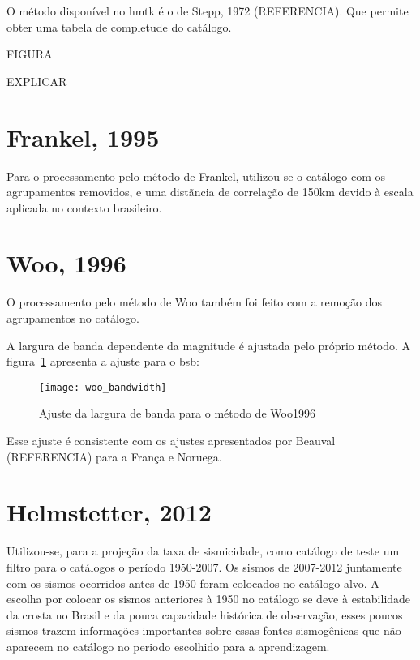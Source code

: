 O método disponível no \gls{hmtk} é o de Stepp, 1972 (REFERENCIA). Que permite
obter uma tabela de completude do catálogo.

FIGURA


EXPLICAR


\section{Frankel, 1995}
\label{sec:proc_frankel}

Para o processamento pelo método de Frankel, utilizou-se o catálogo com os agrupamentos removidos,
e uma distãncia de correlação de 150km devido à escala aplicada no contexto brasileiro.

\section{Woo, 1996}
\label{sec:proc_woo}

O processamento pelo método de Woo também foi feito com a remoção dos agrupamentos no catálogo.

A largura de banda dependente da magnitude é ajustada pelo próprio método.
A figura~\ref{fig:woo_b} apresenta a ajuste para o \gls{bsb}:

\begin{figure}[H]
  \centering
  \texttt{[image: woo\_bandwidth]} 
  \caption{Ajuste da largura de banda para o método de Woo1996}
  \label{fig:woo_b} 
\end{figure}

Esse ajuste é consistente com os ajustes apresentados por Beauval (REFERENCIA)
para a França e Noruega.
 

\section{Helmstetter, 2012}
\label{sec:proc_helmstetter}

Utilizou-se, para a projeção da taxa de sismicidade, como catálogo de teste
um filtro para o catálogos o período 1950-2007. Os sismos de 2007-2012 juntamente
com os sismos ocorridos antes de 1950 foram colocados no catálogo-alvo.
A escolha por colocar os sismos anteriores à 1950 no catálogo se deve à estabilidade
da crosta no Brasil e da pouca capacidade histórica de observação,
esses poucos sismos trazem informações importantes sobre essas fontes
sismogênicas que não aparecem no catálogo no periodo escolhido para a aprendizagem.

